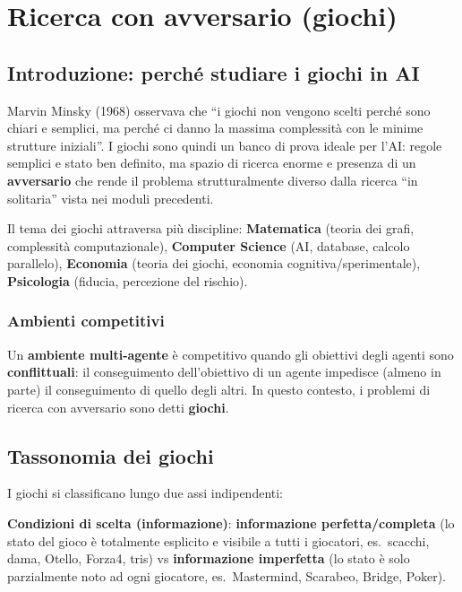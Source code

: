 \documentclass[11pt,a4paper]{report}
\begin{document}
\chapter{Ricerca con avversario (giochi)}

\section{Introduzione: perché studiare i giochi in AI}

Marvin Minsky (1968) osservava che ``i giochi non vengono scelti perché sono chiari e semplici, ma perché ci danno la massima complessità con le minime strutture iniziali''. I giochi sono quindi un banco di prova ideale per l'AI: regole semplici e stato ben definito, ma spazio di ricerca enorme e presenza di un \textbf{avversario} che rende il problema strutturalmente diverso dalla ricerca ``in solitaria'' vista nei moduli precedenti.

Il tema dei giochi attraversa più discipline: \textbf{Matematica} (teoria dei grafi, complessità computazionale), \textbf{Computer Science} (AI, database, calcolo parallelo), \textbf{Economia} (teoria dei giochi, economia cognitiva/sperimentale), \textbf{Psicologia} (fiducia, percezione del rischio).

\subsection*{Ambienti competitivi}

Un \textbf{ambiente multi-agente} è competitivo quando gli obiettivi degli agenti sono \textbf{conflittuali}: il conseguimento dell'obiettivo di un agente impedisce (almeno in parte) il conseguimento di quello degli altri. In questo contesto, i problemi di ricerca con avversario sono detti \textbf{giochi}.

\section{Tassonomia dei giochi}

I giochi si classificano lungo due assi indipendenti:

\textbf{Condizioni di scelta (informazione)}: \textbf{informazione perfetta/completa} (lo stato del gioco è totalmente esplicito e visibile a tutti i giocatori, es.\ scacchi, dama, Otello, Forza4, tris) vs \textbf{informazione imperfetta} (lo stato è solo parzialmente noto ad ogni giocatore, es.\ Mastermind, Scarabeo, Bridge, Poker).
\end{document}
